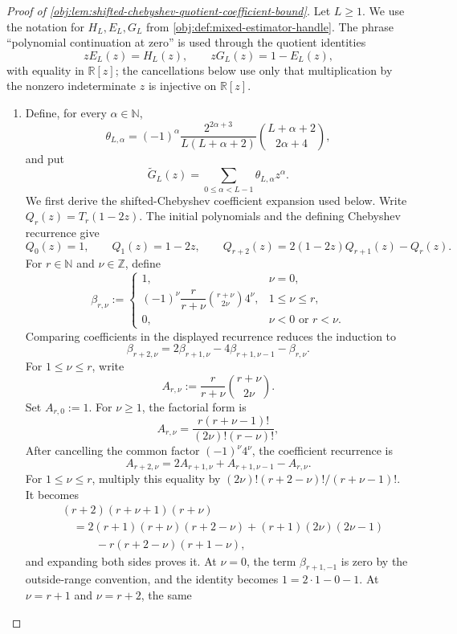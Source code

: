 \begin{proof}[Proof of \cref{obj:lem:shifted-chebyshev-quotient-coefficient-bound}]
Let \(L\ge 1\). We use the notation for \(H_L,E_L,G_L\) from \cref{obj:def:mixed-estimator-handle}. The phrase ``polynomial continuation at zero'' is used through the quotient identities
\[
zE_L(z)=H_L(z),\qquad zG_L(z)=1-E_L(z),
\]
with equality in \(\mathbb R[z]\); the cancellations below use only that multiplication by the nonzero indeterminate \(z\) is injective on \(\mathbb R[z]\).

\begin{enumerate}
\item Define, for every \(\alpha\in\mathbb N\),
\[
\theta_{L,\alpha}
=
(-1)^\alpha
\frac{2^{2\alpha+3}}{L(L+\alpha+2)}
\binom{L+\alpha+2}{2\alpha+4},
\]
and put
\[
\widetilde G_L(z)
=
\sum_{0\le \alpha<L-1}\theta_{L,\alpha}z^\alpha .
\]
We first derive the shifted-Chebyshev coefficient expansion used below.
Write \(Q_r(z)=T_r(1-2z)\).  The initial polynomials and the defining
Chebyshev recurrence give
\[
Q_0(z)=1,\qquad Q_1(z)=1-2z,\qquad
Q_{r+2}(z)=2(1-2z)Q_{r+1}(z)-Q_r(z).
\]
For \(r\in\mathbb N\) and \(\nu\in\mathbb Z\), define
\[
\beta_{r,\nu}:=
\begin{cases}
1, & \nu=0,\\[0.3em]
(-1)^\nu\dfrac{r}{r+\nu}
\binom{r+\nu}{2\nu}4^\nu, & 1\le\nu\le r,\\[0.8em]
0, & \nu<0\text{ or }r<\nu .
\end{cases}
\]
Comparing coefficients in the displayed recurrence reduces the induction to
\[
\beta_{r+2,\nu}
=2\beta_{r+1,\nu}-4\beta_{r+1,\nu-1}-\beta_{r,\nu}.
\]
For \(1\le\nu\le r\), write
\[
A_{r,\nu}:=\frac{r}{r+\nu}\binom{r+\nu}{2\nu}.
\]
Set \(A_{r,0}:=1\).  For \(\nu\ge1\), the factorial form is
\[
A_{r,\nu}
=\frac{r(r+\nu-1)!}{(2\nu)!(r-\nu)!},
\]
After cancelling the common factor
\((-1)^\nu4^\nu\), the coefficient recurrence is
\[
A_{r+2,\nu}
=2A_{r+1,\nu}+A_{r+1,\nu-1}-A_{r,\nu}.
\]
For \(1\le\nu\le r\), multiply this equality by
\((2\nu)!(r+2-\nu)!/(r+\nu-1)!\).  It becomes
\[
\begin{aligned}
&(r+2)(r+\nu+1)(r+\nu)\\
&\quad =
2(r+1)(r+\nu)(r+2-\nu)
+(r+1)(2\nu)(2\nu-1)\\
&\qquad\quad
-r(r+2-\nu)(r+1-\nu),
\end{aligned}
\]
and expanding both sides proves it.  At \(\nu=0\), the term
\(\beta_{r+1,-1}\) is zero by the outside-range convention, and the identity
becomes \(1=2\cdot1-0-1\).  At \(\nu=r+1\) and \(\nu=r+2\), the same

\end{enumerate}
\end{proof}
